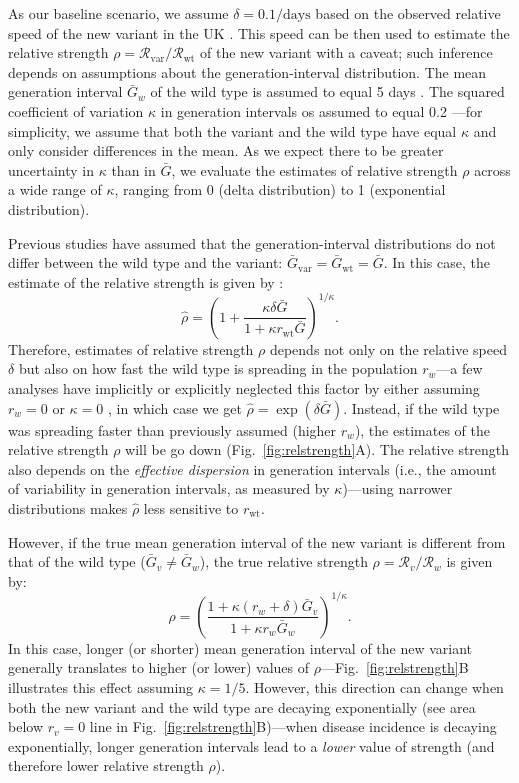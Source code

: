 \documentclass[12pt]{article}
\newcommand{\fref}[1]{Fig.~\ref{fig:#1}}
\newcommand{\rx}[1]{\ensuremath{{r}_{#1}}\xspace}
\newcommand{\ry}[1]{\rx{\mathrm{#1}}}
\newcommand{\Rx}[1]{\ensuremath{{\mathcal R}_{#1}}\xspace}
\newcommand{\Ry}[1]{\Rx{\mathrm{#1}}}
\newcommand{\RR}{\ensuremath{{\mathcal R}}\xspace}
\newcommand{\Gx}[1]{\ensuremath{{\bar G}_{#1}}\xspace}
\newcommand{\Gy}[1]{\Gx{\mathrm{#1}}}
\begin{document}
As our baseline scenario, we assume $\delta = 0.1/\textrm{days}$ based on the observed relative speed of the new variant in the UK \citep{davies2021estimated}.
This speed can be then used to estimate the relative strength $\rho = \Ry{var}/\Ry{wt}$ of the new variant with a caveat; such inference depends on assumptions about the generation-interval distribution.
The mean generation interval $\bar{G}_w$ of the wild type is assumed to equal 5 days \citep{ferretti2020quantifying}.
The squared coefficient of variation $\kappa$ in generation intervals os assumed to equal 0.2 \citep{ferretti2020quantifying}---for simplicity, we assume that both the variant and the wild type have equal $\kappa$ and only consider differences in the mean.
As we expect there to be greater uncertainty in $\kappa$ than in $\bar{G}$, we evaluate the estimates of relative strength $\rho$ across a wide range of $\kappa$, ranging from 0 (delta distribution) to 1 (exponential distribution).

Previous studies have assumed that the generation-interval distributions do not differ between the wild type and the variant: $\Gy{var} = \Gy{wt} = \bar{G}$.
In this case, the estimate of the relative strength is given by \citep{park2019practical}:
\begin{equation}
\hat{\rho} = \left(1 + \frac{\kappa \delta \bar{G}}{1 + \kappa \ry{wt} \bar{G}}\right)^{1/\kappa}.
\end{equation}
Therefore, estimates of relative strength $\rho$ depends not only on the relative speed $\delta$ but also on how fast the wild type is spreading in the population $r_w$---a few analyses have implicitly or explicitly neglected this factor by either assuming $r_w = 0$ \citep{switzerland2021variant} or $\kappa = 0$ \citep{davies2021estimated}, in which case we get $\hat{\rho} = \exp(\delta \bar{G})$.
Instead, if the wild type was spreading faster than previously assumed (higher $r_w$), the estimates of the relative strength $\rho$ will be go down (\fref{relstrength}A).
The relative strength also depends on the \emph{effective dispersion} in generation intervals (i.e., the amount of variability in generation intervals, as measured by $\kappa$)---using narrower distributions makes $\hat{\rho}$ less sensitive to $\ry{wt}$.

However, if the true mean generation interval of the new variant is different from that of the wild type ($\bar{G}_v \neq \bar{G}_w$), the true relative strength $\rho = \RR_v/\RR_w$ is given by:
\begin{equation}
\rho = \left(\frac{1 + \kappa (r_w + \delta) \bar{G}_v}{1 + \kappa r_w \bar{G}_w}\right)^{1/\kappa}.
\end{equation}
In this case, longer (or shorter) mean generation interval of the new variant generally translates to higher (or lower) values of $\rho$---\fref{relstrength}B illustrates this effect assuming $\kappa = 1/5$.
However, this direction can change when both the new variant and the wild type are decaying exponentially (see area below $r_v = 0$ line in \fref{relstrength}B)---when disease incidence is decaying exponentially, longer generation intervals lead to a \emph{lower} value of strength (and therefore lower relative strength $\rho$).
\end{document}
